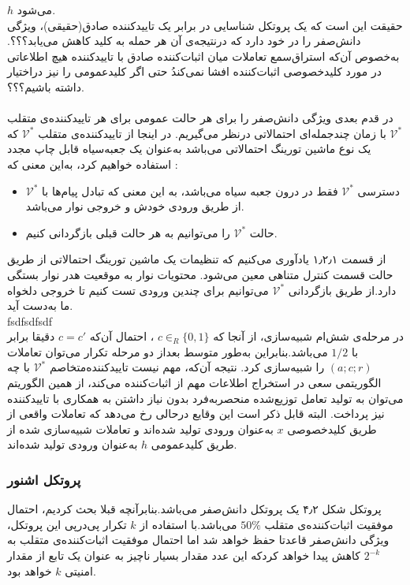 $h$
 می‌شود.
\\
\remark
حقیقت این است که یک پروتکل شناسایی در برابر یک تاییدکننده صادق(حقیقی)، ویژگی دانش‌صفر را در خود دارد که درنتیجه‌ی آن هر حمله‌ به کلید کاهش می‌یابد؟؟؟. به‌خصوص آن‌که استراق‌سمع تعاملات میان اثبات‌کننده صادق با تاییدکننده هیچ اطلاعاتی در مورد کلیدخصوصی اثبات‌کننده افشا نمی‌کندُ حتی اگر کلیدعمومی را نیز دراختیار داشته باشیم؟؟؟.
\\
\\
در قدم بعدی ویژگی دانش‌صفر را برای هر حالت عمومی برای هر تاییدکننده‌ی متقلب 
$\mathcal{V}^*$
با زمان چندجمله‌ای احتمالاتی درنظر می‌گیریم. در اینجا از تاییدکننده‌ی ‌متقلب
$\mathcal{V}^*$
که یک نوع ماشین تورینگ احتمالاتی می‌باشد به‌عنوان یک جعبه‌سیاه
قابل چاپ مجدد
استفاده خواهیم کرد، به‌این معنی که :
\begin{itemize}
\item 
دسترسی 
$\mathcal{V}^*$
فقط در درون جعبه سیاه می‌باشد، به این معنی که تبادل پیام‌ها با 
$\mathcal{V}^*$
از طریق ورودی خودش و خروجی نوار می‌باشد.
\item 
حالت
$\mathcal{V}^*$
را می‌توانیم به هر حالت قبلی بازگردانی کنیم.
\end{itemize}
از قسمت ۱٫۲٫۱ یادآوری می‌کنیم که تنظیمات یک ماشین تورینگ احتمالاتی از طریق حالت قسمت کنترل متناهی معین می‌شود. محتویات نوار به موقعیت هدر نوار بستگی دارد.از طریق بازگردانی
$\mathcal{V}^*$
می‌توانیم برای چندین ورودی‌ تست کنیم تا خروجی دلخواه ما به‌دست آید. 
\\
fsdfsdfsdf
\\
در مرحله‌ی شش‌ام شبیه‌سازی، از آنجا که
$c \in_R \{0,1\}$
، احتمال آن‌که 
$c=c'$
دقیقا برابر با
$1/2$
می‌باشد.بنابراین به‌طور متوسط بعداز دو مرحله‌ تکرار می‌توان تعاملات
$(a;c;r)$
را شبیه‌سازی کرد. نتیجه آن‌که، مهم نیست تاییدکننده‌متخاصم
$\mathcal{V}^*$
با چه الگوریتمی سعی در استخراج اطلاعات مهم از اثبات‌کننده می‌کند، از همین الگوریتم می‌توان به تولید تعامل توزیع‌شده منحصربه‌فرد بدون نیاز داشتن به همکاری با تاییدکننده نیز پرداخت.
البته قابل ذکر است این وقایع درحالی رخ می‌دهد که تعاملات واقعی از طریق کلیدخصوصی 
$x$
به‌عنوان ورودی تولید شده‌اند و تعاملات شبیه‌سازی شده از طریق کلیدعمومی 
$h$
به‌عنوان ورودی تولید شده‌اند.

\subsubsection{پروتکل اشنور}\label{schnorr_protocol}

پروتکل شکل ۴٫۲ یک پروتکل دانش‌صفر می‌باشد.بنابرآنچه قبلا بحث کردیم، احتمال موفقیت اثبات‌کننده‌ی متقلب 
$50\%$
می‌باشد.با استفاده از 
$k$
تکرار پی‌در‌پی این پروتکل، ویژگی دانش‌صفر قاعدتا حفظ خواهد شد اما احتمال موفقیت اثبات‌کننده‌ی متقلب به 
$2^{-k}$
کاهش پیدا خواهد کردکه این عدد مقدار بسیار ناچیز به عنوان یک تابع از مقدار امنیتی
$k$
خواهد بود.
\\

